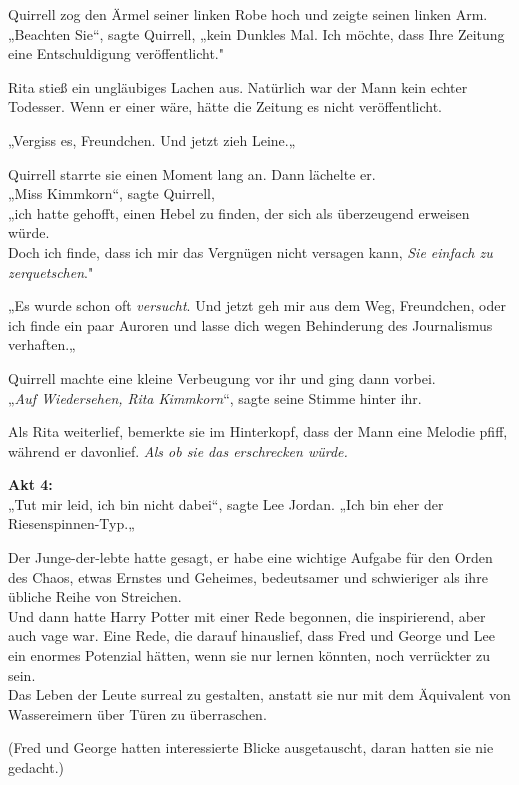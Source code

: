 {Quirrell zog den Ärmel seiner linken Robe hoch und zeigte seinen linken Arm.\\ „Beachten Sie“, sagte Quirrell, „kein Dunkles Mal. Ich möchte, dass Ihre Zeitung eine Entschuldigung veröffentlicht."

Rita stieß ein ungläubiges Lachen aus. Natürlich war der Mann kein echter Todesser. Wenn er einer wäre, hätte die Zeitung es nicht veröffentlicht.

„Vergiss es, Freundchen. Und jetzt zieh Leine.„

Quirrell starrte sie einen Moment lang an. Dann lächelte er.\\ „Miss Kimmkorn“, sagte Quirrell,\\ „ich hatte gehofft, einen Hebel zu finden, der sich als überzeugend erweisen würde.\\ Doch ich finde, dass ich mir das Vergnügen nicht versagen kann, \emph{Sie einfach zu zerquetschen}."

„Es wurde schon oft \emph{versucht}. Und jetzt geh mir aus dem Weg, Freundchen, oder ich finde ein paar Auroren und lasse dich wegen Behinderung des Journalismus verhaften.„

Quirrell machte eine kleine Verbeugung vor ihr und ging dann vorbei.\\ „\emph{Auf Wiedersehen, Rita Kimmkorn}“, sagte seine Stimme hinter ihr.

Als Rita weiterlief, bemerkte sie im Hinterkopf, dass der Mann eine Melodie pfiff, während er davonlief. \emph{Als ob sie das erschrecken würde.}

\textbf{Akt 4:}\\ „Tut mir leid, ich bin nicht dabei“, sagte Lee Jordan. „Ich bin eher der Riesenspinnen-Typ.„

Der Junge-der-lebte hatte gesagt, er habe eine wichtige Aufgabe für den Orden des Chaos, etwas Ernstes und Geheimes, bedeutsamer und schwieriger als ihre übliche Reihe von Streichen.\\ Und dann hatte Harry Potter mit einer Rede begonnen, die inspirierend, aber auch vage war. Eine Rede, die darauf hinauslief, dass Fred und George und Lee ein enormes Potenzial hätten, wenn sie nur lernen könnten, noch verrückter zu sein.\\ Das Leben der Leute surreal zu gestalten, anstatt sie nur mit dem Äquivalent von Wassereimern über Türen zu überraschen.

(Fred und George hatten interessierte Blicke ausgetauscht, daran hatten sie nie gedacht.)

}
